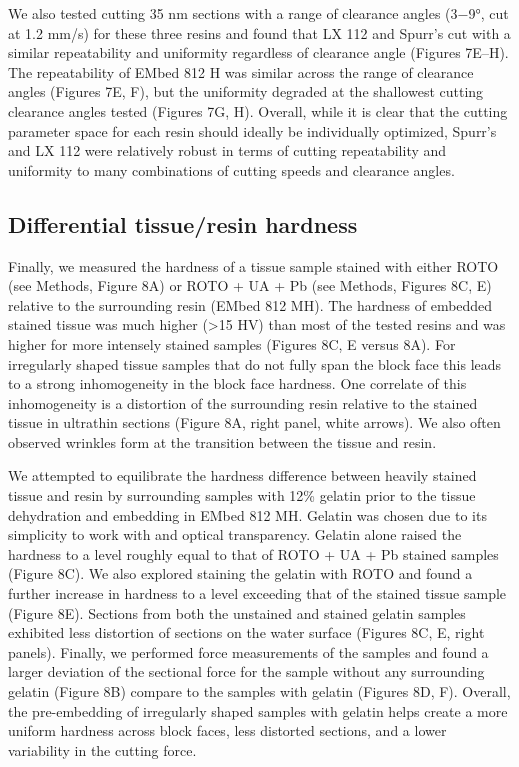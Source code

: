 \documentclass{article}
\begin{document}
We also tested cutting 35 nm sections with a range of clearance angles (3−9°, cut at 1.2 mm/s) for these three resins and found that LX 112 and Spurr’s cut with a similar repeatability and uniformity regardless of clearance angle (Figures 7E–H). The repeatability of EMbed 812 H was similar across the range of clearance angles (Figures 7E, F), but the uniformity degraded at the shallowest cutting clearance angles tested (Figures 7G, H). Overall, while it is clear that the cutting parameter space for each resin should ideally be individually optimized, Spurr’s and LX 112 were relatively robust in terms of cutting repeatability and uniformity to many combinations of cutting speeds and clearance angles.

\subsection*{Differential tissue/resin hardness}

Finally, we measured the hardness of a tissue sample stained with either ROTO (see Methods, Figure 8A) or ROTO + UA + Pb (see Methods, Figures 8C, E) relative to the surrounding resin (EMbed 812 MH). The hardness of embedded stained tissue was much higher (>15 HV) than most of the tested resins and was higher for more intensely stained samples (Figures 8C, E versus 8A). For irregularly shaped tissue samples that do not fully span the block face this leads to a strong inhomogeneity in the block face hardness. One correlate of this inhomogeneity is a distortion of the surrounding resin relative to the stained tissue in ultrathin sections (Figure 8A, right panel, white arrows). We also often observed wrinkles form at the transition between the tissue and resin.

We attempted to equilibrate the hardness difference between heavily stained tissue and resin by surrounding samples with 12\% gelatin prior to the tissue dehydration and embedding in EMbed 812 MH. Gelatin was chosen due to its simplicity to work with and optical transparency. Gelatin alone raised the hardness to a level roughly equal to that of ROTO + UA + Pb stained samples (Figure 8C). We also explored staining the gelatin with ROTO and found a further increase in hardness to a level exceeding that of the stained tissue sample (Figure 8E). Sections from both the unstained and stained gelatin samples exhibited less distortion of sections on the water surface (Figures 8C, E, right panels). Finally, we performed force measurements of the samples and found a larger deviation of the sectional force for the sample without any surrounding gelatin (Figure 8B) compare to the samples with gelatin (Figures 8D, F). Overall, the pre-embedding of irregularly shaped samples with gelatin helps create a more uniform hardness across block faces, less distorted sections, and a lower variability in the cutting force.
\end{document}
